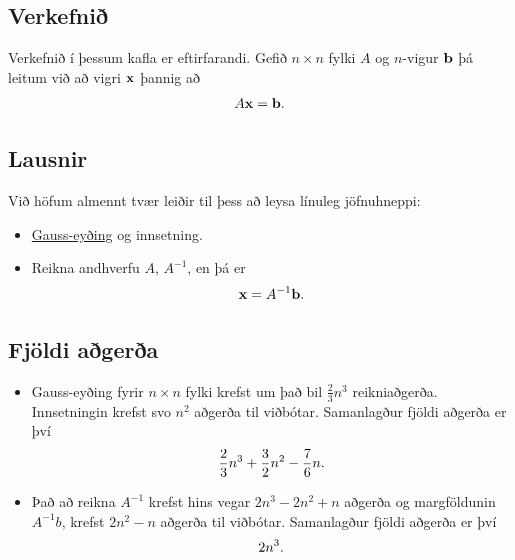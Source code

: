 \documentclass[letterpaper,10pt,icelandic]{sphinxmanual}
\begin{document}
\subsection{Verkefnið}
\label{kafli08:verkefni}
Verkefnið í þessum kafla er eftirfarandi.
Gefið \(n\times n\) fylki \(A\) og \(n\)-vigur
\(\mbox{${\bf b}$}\) þá leitum við að vigri \(\mbox{${\bf x}$}\)
þannig að
\begin{gather}
\begin{split}A\mbox{${\bf x}$}= \mbox{${\bf b}$}.\end{split}\notag
\end{gather}

\subsection{Lausnir}
\label{kafli08:lausnir}
Við höfum almennt tvær leiðir til þess að leysa línuleg jöfnuhneppi:
\begin{itemize}
\item {} 
\href{https://en.wikipedia.org/wiki/Gaussian\_elimination}{Gauss-eyðing} og innsetning.

\item {} 
Reikna andhverfu \(A\), \(A^{-1}\), en þá er
\begin{gather}
\begin{split}\mbox{${\bf x}$}= A^{-1}\mbox{${\bf b}$}.\end{split}\notag
\end{gather}
\end{itemize}


\subsection{Fjöldi aðgerða}
\label{kafli08:index-1}\label{kafli08:fjoldi-agera}\begin{itemize}
\item {} 
Gauss-eyðing fyrir \(n\times n\) fylki krefst um það bil
\(\frac 23n^3\) reikniaðgerða.
Innsetningin krefst svo \(n^2\) aðgerða til viðbótar. Samanlagður
fjöldi aðgerða er því
\begin{gather}
\begin{split}\frac 23n^3+\frac 32n^2 -\frac 76n.\end{split}\notag
\end{gather}
\item {} 
Það að reikna \(A^{-1}\) krefst hins vegar \(2n^3-2n^2+n\)
aðgerða og margföldunin \(A^{-1}b\), krefst \(2n^2-n\)
aðgerða til viðbótar. Samanlagður fjöldi aðgerða er því
\begin{gather}
\begin{split}2n^3.\end{split}\notag
\end{gather}
\end{itemize}
\end{document}
